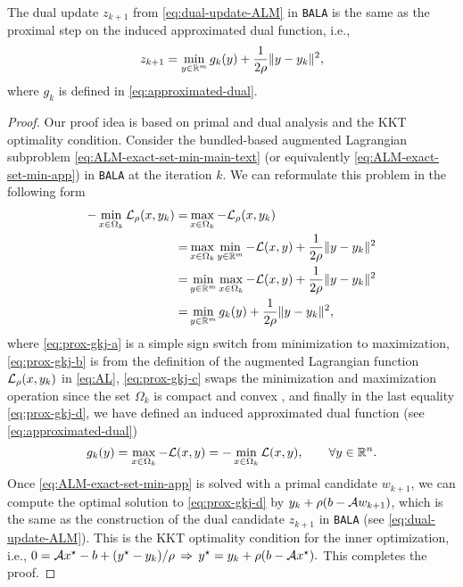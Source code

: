 \documentclass[11pt]{article}
\newcommand{\alg}{\texttt{BALA}}%
\begin{document}
\begin{lemma} \label{eq:dual-bala-proximal}
    The dual update $z_{k+1}$ from \cref{eq:dual-update-ALM} in \alg{} is the same as the proximal step on the induced approximated dual function, i.e.,
    $$
    z_{k+1} = \min_{y \in \mathbb{R}^m} g_{k}(y) + \frac{1}{2\rho}\|y- y_k\|^2,
    $$
    where $g_{k}$ is defined in \cref{eq:approximated-dual}.
\end{lemma}
\begin{proof}
Our proof idea is based on primal and dual analysis and the KKT optimality condition. Consider the bundled-based augmented Lagrangian subproblem \eqref{eq:ALM-exact-set-min-main-text} (or equivalently \cref{eq:ALM-exact-set-min-app}) in \alg{} at the iteration $k$. We can reformulate this problem in the following form
\begin{subequations} \label{eq:prox-gkj}
\begin{align} -\min_{x \in \Omega_{k}}  \mathcal{L}_\rho(x,y_k)   
=&   \max_{x \in \Omega_{k}}  -\mathcal{L}_\rho(x,y_k)  \label{eq:prox-gkj-a}
     \\
     =& \max_{x \in \Omega_{k}} \min_{y \in \mathbb{R}^m} -\mathcal{L}(x,y)+\frac{1}{2\rho}\|y- y_k\|^2 \label{eq:prox-gkj-b} \\
     = & \min_{y \in \mathbb{R}^m} \max_{x \in \Omega_{k}}   -\mathcal{L}(x,y)+\frac{1}{2\rho}\|y- y_k\|^2 \label{eq:prox-gkj-c} \\
     = & \min_{y \in \mathbb{R}^m} g_{k}(y) + \frac{1}{2\rho}\|y- y_k\|^2,  \label{eq:prox-gkj-d}
\end{align}
\end{subequations}
where \cref{eq:prox-gkj-a} is a simple sign switch from minimization to maximization, \cref{eq:prox-gkj-b} is from the definition of the augmented Lagrangian function $\mathcal{L}_\rho(x,y_k)$ in  \cref{eq:AL}, 
\cref{eq:prox-gkj-c} swaps the minimization and maximization operation since the set $\Omega_{k}$ is compact and convex \cite[Corollary 37.3.2]{rockafellar1997convex}, and finally in the last equality \cref{eq:prox-gkj-d}, we have defined an induced approximated dual function (see \cref{eq:approximated-dual})
$$
g_{k}(y) =  \max_{x \in \Omega_{k}} -\mathcal{L}(x,y) = - \min_{x \in \Omega_{k}} \mathcal{L}(x,y), \qquad \forall y \in \mathbb{R}^n. 
$$
Once \eqref{eq:ALM-exact-set-min-app} is solved with a primal candidate $w_{k+1}$, we can compute the optimal solution to \eqref{eq:prox-gkj-d} by  
$y_k + \rho ( b- \mathcal{A} w_{k+1})$, which is the same as the construction of the dual candidate $z_{k+1}$ in \alg{} (see \cref{eq:dual-update-ALM}). This is the KKT optimality condition for the inner optimization, i.e., 
$
0 =\mathcal{A} x^\star - b +(y^\star- y_k)/\rho \, \Rightarrow \, y^\star = y_k + \rho ( b- \mathcal{A} x^\star).
$
This completes the proof.    
\end{proof}
\end{document}
